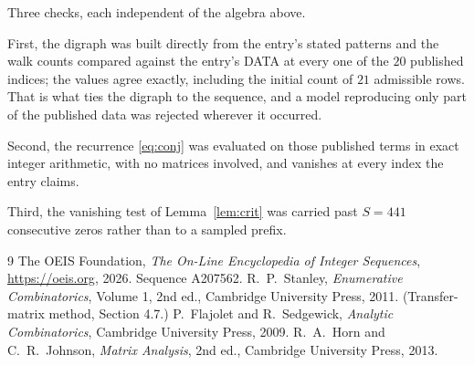 \documentclass[11pt,a4paper]{article}
\theoremstyle{plain}
\theoremstyle{definition}
\begin{document}
Three checks, each independent of the algebra above.

First, the digraph was built directly from the entry's stated patterns and the walk counts
compared against the entry's DATA at every one of the $20$ published indices; the
values agree exactly, including the initial count of $21$ admissible rows. That is
what ties the digraph to the sequence, and a model reproducing only part of the published
data was rejected wherever it occurred.

Second, the recurrence \eqref{eq:conj} was evaluated on those published terms in exact
integer arithmetic, with no matrices involved, and vanishes at every index the entry claims.

Third, the vanishing test of Lemma~\ref{lem:crit} was carried past $S=441$ consecutive
zeros rather than to a sampled prefix.

\begin{thebibliography}{9}
 The OEIS Foundation, \emph{The On-Line Encyclopedia of Integer
Sequences}, \url{https://oeis.org}, 2026. Sequence A207562.
 R.~P.~Stanley, \emph{Enumerative Combinatorics}, Volume 1, 2nd ed.,
Cambridge University Press, 2011. (Transfer-matrix method, Section 4.7.)
 P.~Flajolet and R.~Sedgewick, \emph{Analytic Combinatorics}, Cambridge
University Press, 2009.
 R.~A.~Horn and C.~R.~Johnson, \emph{Matrix Analysis}, 2nd ed., Cambridge
University Press, 2013.
\end{thebibliography}
\end{document}
